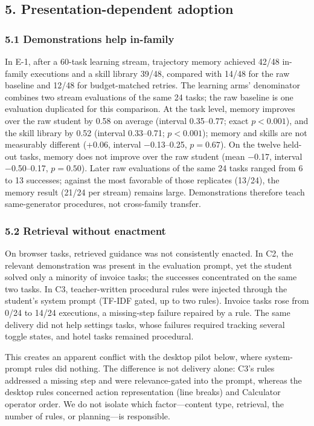 \documentclass[
  10pt,
]{article}
\begin{document}
\subsection{5. Presentation-dependent
adoption}\label{presentation-dependent-adoption}

\subsubsection{5.1 Demonstrations help
in-family}\label{demonstrations-help-in-family}

In E-1, after a 60-task learning stream, trajectory memory achieved
42/48 in-family executions and a skill library 39/48, compared with
14/48 for the raw baseline and 12/48 for budget-matched retries. The
learning arms' denominator combines two stream evaluations of the same
24 tasks; the raw baseline is one evaluation duplicated for this
comparison. At the task level, memory improves over the raw student by
0.58 on average (interval 0.35--0.77; exact \(p<0.001\)), and the skill
library by 0.52 (interval 0.33--0.71; \(p<0.001\)); memory and skills
are not measurably different (+0.06, interval −0.13--0.25, \(p=0.67\)).
On the twelve held-out tasks, memory does not improve over the raw
student (mean −0.17, interval −0.50--0.17, \(p=0.50\)). Later raw
evaluations of the same 24 tasks ranged from 6 to 13 successes; against
the most favorable of those replicates (13/24), the memory result (21/24
per stream) remains large. Demonstrations therefore teach same-generator
procedures, not cross-family transfer.

\subsubsection{5.2 Retrieval without
enactment}\label{retrieval-without-enactment}

On browser tasks, retrieved guidance was not consistently enacted. In
C2, the relevant demonstration was present in the evaluation prompt, yet
the student solved only a minority of invoice tasks; the successes
concentrated on the same two tasks. In C3, teacher-written procedural
rules were injected through the student's system prompt (TF-IDF gated,
up to two rules). Invoice tasks rose from 0/24 to 14/24 executions, a
missing-step failure repaired by a rule. The same delivery did not help
settings tasks, whose failures required tracking several toggle states,
and hotel tasks remained procedural.

This creates an apparent conflict with the desktop pilot below, where
system-prompt rules did nothing. The difference is not delivery alone:
C3's rules addressed a missing step and were relevance-gated into the
prompt, whereas the desktop rules concerned action representation (line
breaks) and Calculator operator order. We do not isolate which
factor---content type, retrieval, the number of rules, or planning---is
responsible.
\end{document}
